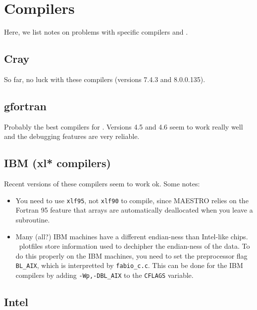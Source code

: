 \section{Compilers}

Here, we list notes on problems with specific compilers and \maestro.


\subsection{Cray}

So far, no luck with these compilers (versions 7.4.3 and 8.0.0.135).


\subsection{gfortran}

Probably the best compilers for \maestro.  Versions 4.5 and 4.6 seem to work
really well and the debugging features are very reliable.


\subsection{IBM (xl* compilers)}

Recent versions of these compilers seem to work ok.  Some notes:
\begin{itemize}
\item You need to use {\tt xlf95}, not {\tt xlf90} to compile, since
  MAESTRO relies on the Fortran 95 feature that arrays are
  automatically deallocated when you leave a subroutine.

\item Many (all?) IBM machines have a different endian-ness than
  Intel-like chips.  \boxlib\ plotfiles store information used to
  dechipher the endian-ness of the data.  To do this properly on
  the IBM machines, you need to set the preprocessor flag {\tt BL\_AIX},
  which is interpretted by {\tt fabio\_c.c}.  This can be done for the
  IBM compilers by adding {\tt -Wp,-DBL\_AIX} to the {\tt CFLAGS} variable.

\end{itemize}

\subsection{Intel}

